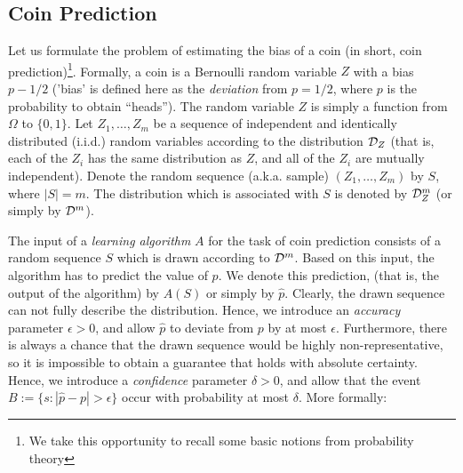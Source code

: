 \subsection{Coin Prediction}  \label{sec:basicConcentration}
Let us formulate the problem of estimating the bias of a
coin (in short, coin prediction)\footnote{We take this opportunity to recall some basic notions from probability theory}. Formally, a coin is a Bernoulli random variable $Z$ with a bias $p - 1/2$ ('bias' is defined here as the \textit{deviation} from $p=1/2$, where $p$ is the probability to obtain ``heads''). 
The random variable $Z$ is simply a function from $\Omega$ to $\{0,1\}$. Let $Z_1,
\ldots, Z_m$ be a sequence of independent and identically distributed
(i.i.d.) random variables according to the distribution $\mathcal{D}_Z$ (that
is, each of the $Z_i$ has the same distribution as $Z$, and all of the
$Z_i$ are mutually independent). Denote the random sequence  (a.k.a. sample)
$(Z_1,\ldots, Z_m)$ by $S$, where $|S|=m$. The distribution which is associated with $S$ is denoted by $\mathcal{D}_Z ^m$ (or simply by $\mathcal{D}^m$).

The input of a \emph{learning algorithm} $A$ for the task of coin prediction consists of a random sequence $S$ which is drawn according to
$\mathcal{D}^m$. Based on this input, the algorithm has to predict the value of $p$. We denote this prediction, (that is, the output of the algorithm) by $A(S)$ or simply by $\hat{p}$. Clearly, the drawn sequence can not fully describe the distribution. Hence, we introduce an \emph{accuracy} parameter $\epsilon>0$, and allow $\hat{p}$ to deviate from $p$ by at most $\epsilon$. Furthermore, there is always a chance that the drawn sequence would be highly non-representative, so it is impossible to obtain a guarantee that holds with absolute certainty. Hence, we introduce a \emph{confidence} parameter $\delta>0$, and allow that the event $B:=\{s : |\hat{p}-p|>\epsilon\}$ occur with probability at
most $\delta$. More formally:

